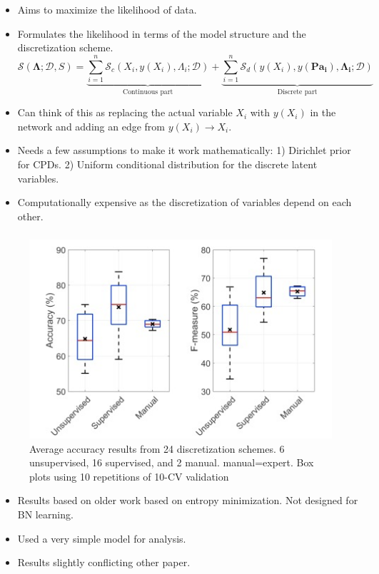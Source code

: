\documentclass{beamer}
\begin{document}
\begin{frame}
	\frametitle{}
	\begin{itemize}
		\item Aims to maximize the likelihood of data.
		\item Formulates the likelihood in terms of the model structure and the discretization scheme.
		\begin{equation}
			\mathcal{S}(\bm{\Lambda}; \mathcal{D}, S) = \underbrace{\sum_{i=1}^n \mathcal{S}_c(X_i, y(X_i), \Lambda_i; \mathcal{D})}_{\text{Continuous part}} + \underbrace{\sum_{i=1}^n \mathcal{S}_d(y(X_i), y(\mathbf{Pa_i}), \bm{\Lambda_i}; \mathcal{D})}_{\text{Discrete part}}
		\end{equation}
	\item Can think of this as replacing the actual variable $ X_i $ with $ y(X_i) $ in the network and adding an edge from $ y(X_i) \to X_i $.
		\item Needs a few assumptions to make it work mathematically: 1) Dirichlet prior for CPDs. 2) Uniform conditional distribution for the discrete latent variables.
		\item Computationally expensive as the discretization of variables depend on each other.
	\end{itemize}
\end{frame}

\begin{frame}
	\frametitle{}
	\begin{figure}
		\centering
		\includegraphics[scale=0.4]{imgs/disc_empirical.png}
		\caption*{\footnotesize{Average accuracy results from 24 discretization schemes. 6 unsupervised, 16 supervised, and 2 manual. manual=expert. Box plots using 10 repetitions of 10-CV validation}}
	\end{figure}
	\vspace{-1em}
	\begin{itemize}
		\item Results based on older work based on entropy minimization. Not designed for BN learning.
		\item Used a very simple model for analysis.
		\item Results slightly conflicting other paper.
	\end{itemize}
\end{frame}
\end{document}
